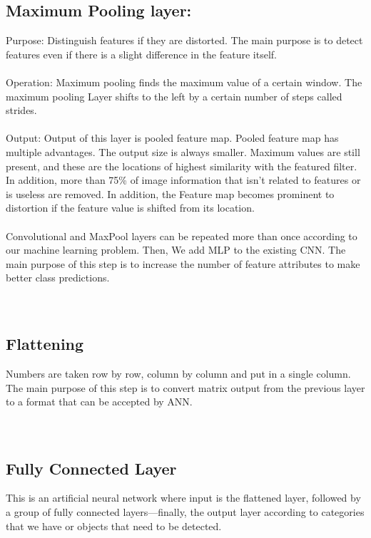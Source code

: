 \documentclass[12pt,letterpaper, onecolumn]{exam}
\begin{document}
  \subsection{ Maximum Pooling layer:}
    Purpose: Distinguish features if they are distorted. The main purpose is to detect features even if there is a slight difference in the feature itself.\\\\

  Operation: Maximum pooling finds the maximum value of a certain window. The maximum pooling Layer shifts to the left by a certain number of steps called strides.\\\\

  Output: Output of this layer is pooled feature map. Pooled feature map has multiple advantages. The output size is always smaller. Maximum values are still present, and these    are the locations of highest similarity with the featured filter. In addition, more than 75\% of image information that isn’t related to features or is useless are removed. In    addition, the Feature map becomes prominent to distortion if the feature value is shifted from its location.
 \\\\
  Convolutional and MaxPool layers can be repeated more than once according to our machine learning problem. Then, We add MLP to the existing CNN. The main purpose of this step    is to increase the number of feature attributes to make better class predictions.\\\\\\
  
  \subsection{Flattening}
  Numbers are taken row by row, column by column and put in a single column. The main purpose of this step is to convert matrix output from the previous layer to a format that     can be accepted by ANN.\\\\\\
  \subsection{Fully Connected Layer}
  This is an artificial neural network where input is the flattened layer, followed by a group of fully connected layers—finally, the output layer according to categories that     we have or objects that need to be detected.
  
\end{document}
